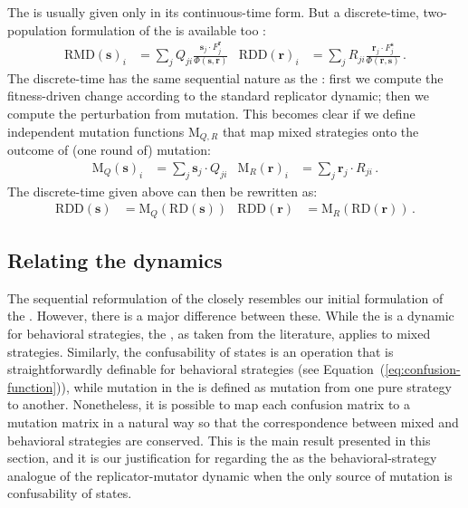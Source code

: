 \documentclass[fleqn,reqno,10pt]{article}
\renewcommand{\Smixed}{\ensuremath{\mathrm{\mathbf{s}}}}
\renewcommand{\Rmixed}{\ensuremath{\mathrm{\mathbf{r}}}}
\newcommand{\rmd}{\acro{rmd}} %
\newcommand{\rdd}{\acro{rdd}} %
\newcommand{\RD}{\ensuremath{\mathrm{RD}}} %
\newcommand{\RDD}{\ensuremath{\mathrm{RDD}}} %
\newcommand{\RMD}{\ensuremath{\mathrm{RMD}}} %
\newcommand{\Mutate}{\ensuremath{\mathrm{M}}} %
\begin{document}
The \rmd is usually given only in its continuous-time form. %
But a discrete-time, two-population formulation of the \rmd is
available too \citep[c.f.][97]{PageNowak2002:Unifying-Evolut}:
\begin{align*}
  \RMD(\Smixed)_i & = \sum_{j} Q_{ji} \frac{\Smixed_j \cdot
    F_j^{\Rmixed}}{ \Phi(\Smixed,\Rmixed)} & \RDD(\Rmixed)_i & =
  \sum_{j} R_{ji} \frac{\Rmixed_j \cdot F_j^{\Smixed}}{
    \Phi(\Rmixed,\Smixed)}\,.
\end{align*}
The discrete-time \rmd has the same sequential nature as the \rdd:
first we compute the fitness-driven change according to the standard
replicator dynamic; then we compute the perturbation from
mutation. This becomes clear if we define independent mutation
functions $\Mutate_{Q,R}$ that map mixed strategies onto the outcome
of (one round of) mutation:
\begin{align}
  \label{eq:Mutation}
  \Mutate_Q(\Smixed)_i & =  \sum_j  \Smixed_j \cdot
  Q_{ji} &   \Mutate_R(\Rmixed)_i & =  \sum_{j}  \Rmixed_j \cdot
  R_{ji} \,.
\end{align}
The discrete-time \rmd given above can then be rewritten as:
\begin{align*}
  \RDD(\Smixed) &= \Mutate_Q(\RD(\Smixed)) &   \RDD(\Rmixed) &= \Mutate_R(\RD(\Rmixed))\,.
\end{align*}

\subsection{Relating the dynamics}
\label{sec:relating-dynamics}

The sequential reformulation of the \rmd closely resembles our initial
formulation of the \rdd. However, there is a major difference between
these. While the \rdd is a dynamic for behavioral strategies, the
\rmd, as taken from the literature, applies to mixed
strategies. Similarly, the confusability of states is an operation
that is straightforwardly definable for behavioral strategies (see
Equation~(\ref{eq:confusion-function})), while mutation in the \rmd is
defined as mutation from one pure strategy to another. Nonetheless, it
is possible to map each confusion matrix to a mutation matrix in a
natural way so that the correspondence between mixed and behavioral
strategies are conserved. This is the main result presented in this
section, and it is our justification for regarding the \rdd as the
behavioral-strategy analogue of the replicator-mutator dynamic when
the only source of mutation is confusability of states.
\end{document}
